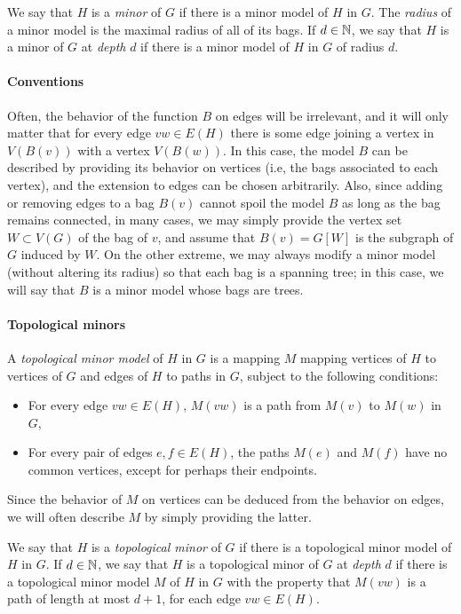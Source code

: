 We say that $H$ is a \emph{minor} of $G$
if there is a minor model of $H$ in $G$. 
The \emph{radius} of a minor 
model is the maximal radius of all of its bags.
If $d\in\mathbb{N}$,
we say that $H$ is a minor of $G$
at \emph{depth} $d$ if there is a minor model of $H$
in $G$ of radius $d$.

\paragraph{Conventions}
Often, the 
behavior of the function
 $B$ on edges will be irrelevant, and it will only matter that 
 for every edge $vw\in E(H)$ there is some edge joining a vertex in $V(B(v))$ with a vertex $V(B(w))$. In this case, the model $B$ can be 
 described by providing its behavior on vertices (i.e, the bags associated to each vertex), and the extension to edges can be chosen arbitrarily. Also, since adding or removing edges to a bag $B(v)$ cannot 
 spoil the model $B$ as long as the bag remains connected, in many cases, we may simply provide the vertex set $W\subset V(G)$ of the bag of $v$, and assume that $B(v)=G[W]$ is the subgraph of $G$ induced by $W$.
 On the other extreme,  
 we may always modify a minor model (without altering its radius) so that each bag is a spanning tree; in this case, we will say that $B$ is a minor model whose bags are trees. 
 


\paragraph{Topological minors}
A \emph{topological minor model} of $H$ in $G$
is a mapping $M$ 
mapping vertices of $H$ to vertices of $G$ 
and  edges of $H$ to paths in $G$,
subject to the following conditions:
\begin{itemize}
	\item For every edge $vw\in E(H)$, 
	$M(vw)$ is a path from $M(v)$ to $M(w)$ in $G$,
	\item For every pair of edges $e,f\in E(H)$,
	the paths $M(e)$ and $M(f)$ have no common vertices,
	except for perhaps their endpoints.	
\end{itemize}
Since the behavior of $M$ on vertices can be deduced from the behavior on edges, we will often describe $M$ by simply providing the latter.

We say that $H$ is a \emph{topological minor} of $G$
if there is a topological minor model of $H$ in $G$.
If $d\in \mathbb{N}$, we say that $H$ is a topological minor of $G$ at \emph{depth} $d$ if there is a topological minor model $M$ of $H$ in $G$ with the property that 
$M(vw)$ is a path of length at most $d+1$, for each edge $vw\in E(H)$.


